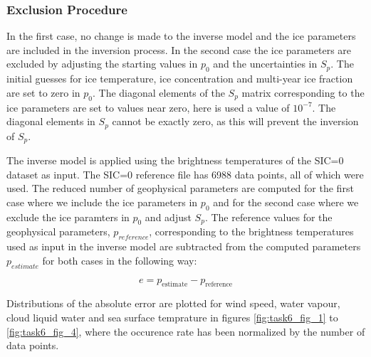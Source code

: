 \documentclass[11pt, a4paper]{article}
\begin{document}
\subsubsection{Exclusion Procedure}
In the first case, no change is made to the inverse model and the ice parameters are included in the inversion process. In the second case the ice parameters are excluded by adjusting the starting values in \(p_0\) and the uncertainties in \(S_p\). The initial guesses for ice temperature, ice concentration and multi-year ice fraction are set to zero in \(p_0\). The diagonal elements of the \(S_p\) matrix corresponding to the ice parameters are set to values near zero, here is used a value of \(10^{-7}\). The diagonal elements in \(S_p\) cannot be exactly zero, as this will prevent the inversion of \(S_p\).  
\newline

The inverse model is applied using the brightness temperatures of the SIC=0 dataset as input. The SIC=0 reference file has 6988 data points, all of which were used. The reduced number of geophysical parameters are computed for the first case where we include the ice parameters in \(p_0\) and for the second case where we exclude the ice paramters in \(p_0\) and adjust \(S_p\). The reference values for the geophysical parameters, \(p_{reference}\), corresponding to the brightness temperatures used as input in the inverse model are subtracted from the computed parameters \(p_{estimate}\) for both cases in the following way:

\begin{equation*}
e = p_\text{estimate} - p_\text{reference}
\end{equation*} 

Distributions of the absolute error are plotted for wind speed, water vapour, cloud liquid water and sea surface temprature in figures \ref{fig:task6_fig_1} to \ref{fig:task6_fig_4}, where the occurence rate has been normalized by the number of data points.   
\newline
\end{document}
